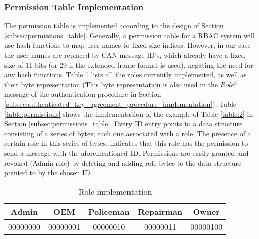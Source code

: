 \subsubsection{Permission Table Implementation}
\label{subsec:permissions_table_implementation}

The permission table is implemented according to the design of Section \ref{subsec:permissions_table}. Generally, a permission table for a RBAC system will use hash functions to map user names to fixed size indices. However, in our case the user names are replaced by CAN message ID's, which already have a fixed size of 11 bits (or 29 if the extended frame format is used), negating the need for any hash functions. Table \ref{table:roles} lists all the roles currently implemented, as well as their byte representation (This byte representation is also used in the $Role^{8}$ message of the authentication procedure in Section \ref{subsec:authenticated_key_agreement_procedure_implementation}). Table \ref{table:permissions} shows the implementation of the example of Table \ref{table:2} in Section \ref{subsec:permissions_table}. Every ID entry points to a data structure consisting of a series of bytes; each one associated with a role. The presence of a certain role in this series of bytes, indicates that this role has the permission to send a message with the aforementioned ID. Permissions are easily granted and revoked (Admin role) by deleting and adding role bytes to the data structure pointed to by the chosen ID. 

\begin{table}[]
	\centering
	\begin{tabular}{|c|c|c|c|c|}
		\hline
		\rowcolor[HTML]{9B9B9B} 
		Admin & OEM & Policeman & Repairman & Owner \\ \hline
		\rowcolor[HTML]{FFFFFF} 
		00000000 & 00000001 & 00000010 & 00000011 & 00000100 \\ \hline
	\end{tabular}
	\caption{Role implementation}
	\label{table:roles}
\end{table}

